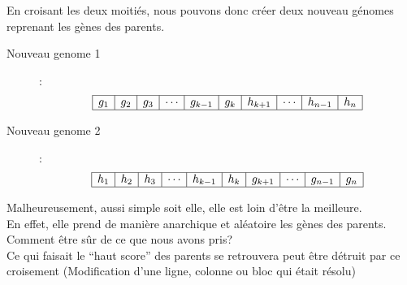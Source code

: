                     En croisant les deux moitiés, nous pouvons donc créer deux nouveau génomes reprenant les gènes des parents.
                    \begin{description}
                        \item[Nouveau genome 1]:\\
                            \[
                                \begin{array}{|c|c|c|c|c|c|c|c|c|c|}
                                    \hline
                                    g_1&g_2&g_3&\cdots&g_{k-1}&g_k&h_{k+1}&\cdots&h_{n-1}&h_{n}\\
                                    \hline
                                \end{array}
                            \]
                        \item[Nouveau genome 2]:\\
                            \[
                                \begin{array}{|c|c|c|c|c|c|c|c|c|c|}
                                    \hline
                                    h_1&h_2&h_3&\cdots&h_{k-1}&h_k&g_{k+1}&\cdots&g_{n-1}&g_{n}\\
                                    \hline
                                \end{array}
                            \]
                    \end{description}
                    Malheureusement, aussi simple soit elle, elle est loin d'être la meilleure.\\
                    En effet, elle prend de manière anarchique et aléatoire les gènes des parents. Comment être sûr de ce que nous avons pris?\\
                    Ce qui faisait le ``haut score'' des parents se retrouvera peut être détruit par ce croisement (Modification d'une ligne, colonne ou bloc qui était résolu)
